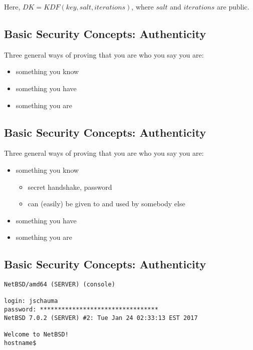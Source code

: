 \documentclass[xga]{xdvislides}
\begin{document}
Here, $DK = KDF(key, salt, iterations)$, where $salt$
and $iterations$ are public.

\subsection{Basic Security Concepts: Authenticity}
Three general ways of proving that you are who you say you are:
\begin{itemize}
	\item something you know
	\item something you have
	\item something you are
\end{itemize}

\subsection{Basic Security Concepts: Authenticity}
Three general ways of proving that you are who you say you are:
\begin{itemize}
	\item something you know
		\begin{itemize}
			\item secret handshake, password
			\item can (easily) be given to and used by somebody else
		\end{itemize}
	\item something you have
	\item something you are
\end{itemize}

\subsection{Basic Security Concepts: Authenticity}
\begin{verbatim}
NetBSD/amd64 (SERVER) (console)

login: jschauma
password: *********************************
NetBSD 7.0.2 (SERVER) #2: Tue Jan 24 02:33:13 EST 2017

Welcome to NetBSD!
hostname$ 
\end{verbatim}
\end{document}
